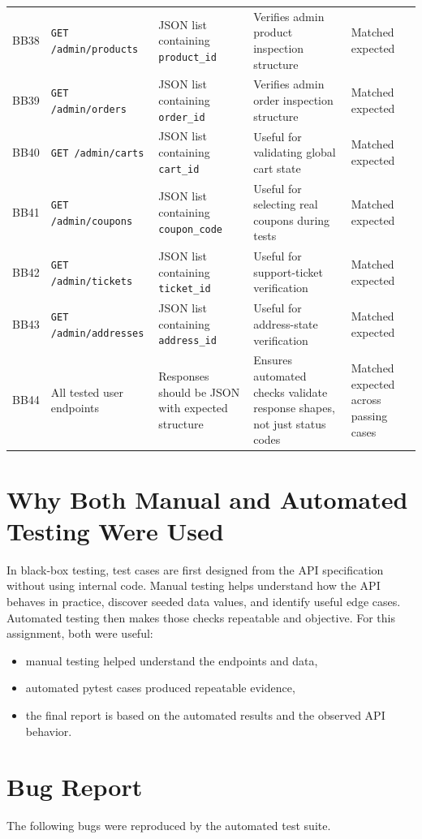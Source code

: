 \documentclass[12pt]{article}
\begin{document}
\begin{longtable}{p{}p{}p{}p{}p{}}
BB38 & \texttt{GET /admin/products} & JSON list containing \texttt{product\_id} & Verifies admin product inspection structure & Matched expected \\
BB39 & \texttt{GET /admin/orders} & JSON list containing \texttt{order\_id} & Verifies admin order inspection structure & Matched expected \\
BB40 & \texttt{GET /admin/carts} & JSON list containing \texttt{cart\_id} & Useful for validating global cart state & Matched expected \\
BB41 & \texttt{GET /admin/coupons} & JSON list containing \texttt{coupon\_code} & Useful for selecting real coupons during tests & Matched expected \\
BB42 & \texttt{GET /admin/tickets} & JSON list containing \texttt{ticket\_id} & Useful for support-ticket verification & Matched expected \\
BB43 & \texttt{GET /admin/addresses} & JSON list containing \texttt{address\_id} & Useful for address-state verification & Matched expected \\
BB44 & All tested user endpoints & Responses should be JSON with expected structure & Ensures automated checks validate response shapes, not just status codes & Matched expected across passing cases \\
\end{longtable}
\normalsize

\section{Why Both Manual and Automated Testing Were Used}
In black-box testing, test cases are first designed from the API specification without using internal code. Manual testing helps understand how the API behaves in practice, discover seeded data values, and identify useful edge cases. Automated testing then makes those checks repeatable and objective. For this assignment, both were useful:
\begin{itemize}
    \item manual testing helped understand the endpoints and data,
    \item automated pytest cases produced repeatable evidence,
    \item the final report is based on the automated results and the observed API behavior.
\end{itemize}

\section{Bug Report}
The following bugs were reproduced by the automated test suite.
\end{document}
